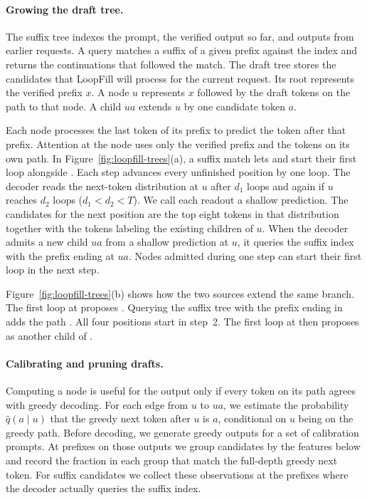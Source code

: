 \paragraph{Growing the draft tree.}
The suffix tree indexes the prompt, the verified output so far,
and outputs from earlier requests. A query matches a suffix of a given
prefix against the index and returns the continuations that followed the
match. The draft tree stores the candidates that LoopFill will
process for the current request. Its root represents the verified prefix
$x$. A node $u$ represents
$x$ followed by the draft tokens on the path to that node. A child
$ua$ extends $u$ by one candidate token $a$.

Each node processes the last token of its prefix to predict the token
after that prefix. Attention at the node uses only the verified
prefix and the tokens on its own path. In Figure~\ref{fig:loopfill-trees}(a),
a suffix match lets  and  start their first loop
alongside . Each step advances every unfinished
position by one loop. The decoder reads the next-token distribution at $u$
after $d_1$ loops and again if $u$ reaches $d_2$ loops ($d_1<d_2<T$).
We call each readout a shallow prediction. The candidates for
the next position are the top eight
tokens in that distribution together with the tokens labeling the
existing children of $u$. When the decoder admits a new child $ua$ from
a shallow prediction at $u$, it queries the suffix index with the prefix
ending at $ua$. Nodes admitted during one step can start their first
loop in the next step.

Figure~\ref{fig:loopfill-trees}(b) shows how the two sources extend the
same branch. The first loop at  proposes .
Querying the suffix tree with the prefix ending in  adds
the path   . All four positions
start in step~2. The first loop at  then proposes
 as another child of .

\paragraph{Calibrating and pruning drafts.}
Computing a node is useful for the output only if every token on its
path agrees with greedy decoding. For each edge from $u$ to $ua$, we
estimate the probability $\hat q(a\mid u)$ that the greedy next token
after $u$ is $a$, conditional on $u$ being on the greedy path. Before
decoding, we generate greedy outputs for a set of calibration prompts.
At prefixes on those outputs we group candidates by the features below
and record the fraction in each group that match the full-depth greedy
next token. For suffix candidates we collect these observations at the
prefixes where the decoder actually queries the suffix index.

